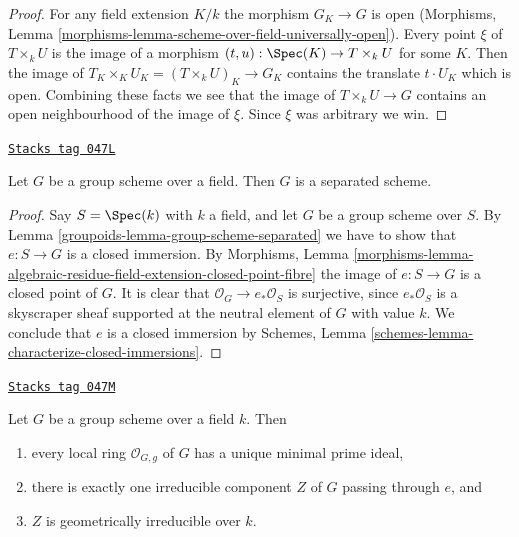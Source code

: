 \begin{proof}
For any field extension $K/k$ the morphism $G_K \to G$ is open
(Morphisms, Lemma \ref{morphisms-lemma-scheme-over-field-universally-open}).
Every point $\xi$ of $T \times_k U$ is the image of a morphism
$(t, u) : \Spec(K) \to T \times_k U$ for some $K$. Then the image of
$T_K \times_K U_K = (T \times_k U)_K \to G_K$ contains the translate
$t \cdot U_K$ which is open. Combining these facts we see that the
image of $T \times_k U \to G$ contains an open neighbourhood of
the image of $\xi$. Since $\xi$ was arbitrary we win.
\end{proof}

\begin{lemma}
\label{groupoids-lemma-group-scheme-over-field-separated}
\href{https://stacks.math.columbia.edu/tag/047L}{\texttt{Stacks tag 047L}}

Let $G$ be a group scheme over a field.
Then $G$ is a separated scheme.
\end{lemma}

\begin{proof}

Say $S = \Spec(k)$ with $k$ a field, and let $G$ be a group scheme
over $S$. By
Lemma \ref{groupoids-lemma-group-scheme-separated}
we have to show that $e : S \to G$ is a closed immersion. By
Morphisms, Lemma
\ref{morphisms-lemma-algebraic-residue-field-extension-closed-point-fibre}
the image of $e : S \to G$ is a closed point of $G$.
It is clear that $\mathcal{O}_G \to e_*\mathcal{O}_S$ is surjective,
since $e_*\mathcal{O}_S$ is a skyscraper sheaf supported at the neutral
element of $G$ with value $k$. We conclude that $e$ is a closed immersion by
Schemes, Lemma \ref{schemes-lemma-characterize-closed-immersions}.
\end{proof}

\begin{lemma}
\label{groupoids-lemma-group-scheme-field-geometrically-irreducible}
\href{https://stacks.math.columbia.edu/tag/047M}{\texttt{Stacks tag 047M}}

Let $G$ be a group scheme over a field $k$.
Then
\begin{enumerate}
\item every local ring $\mathcal{O}_{G, g}$ of $G$ has a unique
minimal prime ideal,
\item there is exactly one irreducible component $Z$ of $G$
passing through $e$, and
\item $Z$ is geometrically irreducible over $k$.
\end{enumerate}
\end{lemma}

